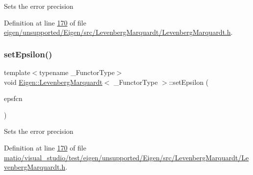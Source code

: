 Sets the error precision 

Definition at line \hyperlink{eigen_2unsupported_2_eigen_2src_2_levenberg_marquardt_2_levenberg_marquardt_8h_source_l00170}{170} of file \hyperlink{eigen_2unsupported_2_eigen_2src_2_levenberg_marquardt_2_levenberg_marquardt_8h_source}{eigen/unsupported/\+Eigen/src/\+Levenberg\+Marquardt/\+Levenberg\+Marquardt.\+h}.

\mbox{\label{class_eigen_1_1_levenberg_marquardt_a3e13f6631ae59be984ee1ea196899cd7}} 
\subsubsection{\texorpdfstring{set\+Epsilon()}{setEpsilon()}\hspace{0.1cm}{\footnotesize\ttfamily [2/2]}}
{\footnotesize\ttfamily template$<$typename \+\_\+\+Functor\+Type$>$ \\
void \hyperlink{class_eigen_1_1_levenberg_marquardt}{Eigen\+::\+Levenberg\+Marquardt}$<$ \+\_\+\+Functor\+Type $>$\+::set\+Epsilon (\begin{DoxyParamCaption}\item[{Real\+Scalar}]{epsfcn }\end{DoxyParamCaption})\hspace{0.3cm}{\ttfamily [inline]}}

Sets the error precision 

Definition at line \hyperlink{matio_2visual__studio_2test_2eigen_2unsupported_2_eigen_2src_2_levenberg_marquardt_2_levenberg_marquardt_8h_source_l00170}{170} of file \hyperlink{matio_2visual__studio_2test_2eigen_2unsupported_2_eigen_2src_2_levenberg_marquardt_2_levenberg_marquardt_8h_source}{matio/visual\+\_\+studio/test/eigen/unsupported/\+Eigen/src/\+Levenberg\+Marquardt/\+Levenberg\+Marquardt.\+h}.

\mbox{\label{class_eigen_1_1_levenberg_marquardt_a4af7d41545ec5908485357493839e6f6}} 
